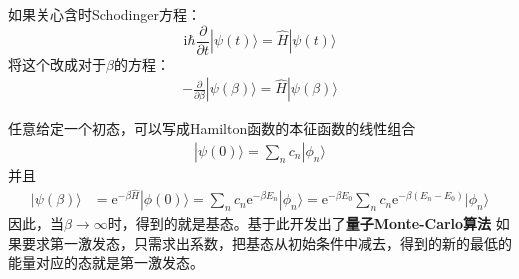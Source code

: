         如果关心含时Schodinger方程：
        \begin{equation}
            \mathrm{i}\hbar \frac {\partial}{\partial t} | \psi(t) \rangle = \hat{H}|\psi(t) \rangle
        \end{equation}
        将这个改成对于$\beta$的方程：
        \begin{equation}\begin{aligned}
            -\frac {\partial}{\partial \beta} |\psi(\beta) \rangle = \hat{H} |\psi(\beta) \rangle
        \end{aligned}\end{equation}

        任意给定一个初态，可以写成Hamilton函数的本征函数的线性组合
        \begin{equation}\begin{aligned}
            |\psi(0) \rangle = \sum_n c_n |\phi_n\rangle
        \end{aligned}\end{equation}
        并且
        \begin{equation}\begin{aligned}
            |\psi(\beta) \rangle &= \mathrm{e}^{-\beta \hat{H}} |\phi(0) \rangle = \sum_n c_n\mathrm{e}^{-\beta E_n}|\phi_n \rangle = \mathrm{e}^{-\beta E_0} \sum_n c_n \mathrm{e}^{-\beta(E_n-E_0)} |\phi_n \rangle
        \end{aligned}\end{equation}
        因此，当$\beta \to \infty$时，得到的就是基态。基于此开发出了\textbf{量子Monte-Carlo算法}
        如果要求第一激发态，只需求出系数，把基态从初始条件中减去，得到的新的最低的能量对应的态就是第一激发态。

    
    